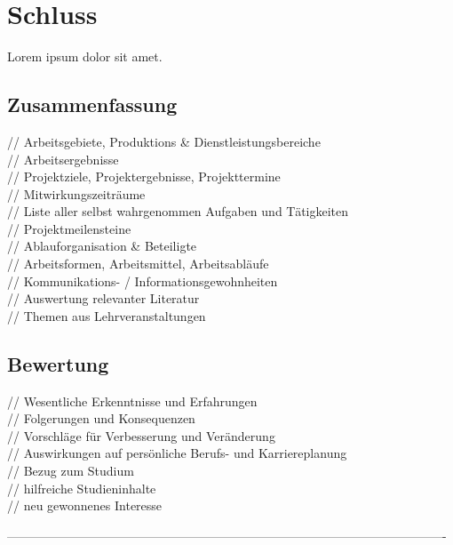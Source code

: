 \documentclass[12pt,a4paper,bibliography=totocnumbered,listof=totocnumbered]{scrartcl}
\begin{document}
\pagebreak

\section{Schluss}
Lorem ipsum dolor sit amet.

\subsection{Zusammenfassung}
// Arbeitsgebiete, Produktions \& Dienstleistungsbereiche\\
// Arbeitsergebnisse\\
// Projektziele, Projektergebnisse, Projekttermine\\
// Mitwirkungszeiträume\\
// Liste aller selbst wahrgenommen Aufgaben und Tätigkeiten\\
// Projektmeilensteine\\
// Ablauforganisation \& Beteiligte\\
// Arbeitsformen, Arbeitsmittel, Arbeitsabläufe\\
// Kommunikations- / Informationsgewohnheiten\\
// Auswertung relevanter Literatur\\
// Themen aus Lehrveranstaltungen\\

\subsection{Bewertung}
// Wesentliche Erkenntnisse und Erfahrungen\\
// Folgerungen und Konsequenzen\\
// Vorschläge für Verbesserung und Veränderung\\
// Auswirkungen auf persönliche Berufs- und Karriereplanung\\
// Bezug zum Studium\\
// hilfreiche Studieninhalte\\
// neu gewonnenes Interesse\\
\pagebreak

%
----------------------------------------------------------------------------------------------------------
\renewcommand\refname{Quellenverzeichnis}


\pagebreak
\end{document}
